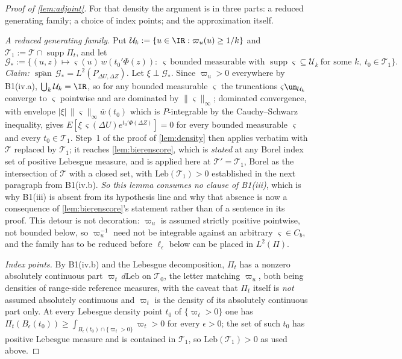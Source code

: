 \begin{proof}[Proof of \cref{lem:adjoint}]
For that density the argument is in three parts: a reduced generating family; a
choice of index points; and the approximation itself.

\emph{A reduced generating family.} Put $\mathcal U_k:=\{u\in\IR:\varpi_u(u)\ge1/k\}$ and
$\mathcal T_1:=\mathcal T\cap\operatorname{supp}\Pi_t$, and let
\[
\mathcal G_\ast:=\big\{(u,z)\mapsto\varsigma(u)\,w(t_0'\Phi(z)):\ \varsigma\ \text{bounded measurable with }
\operatorname{supp}\varsigma\subseteq\mathcal U_k\ \text{for some }k,\ t_0\in\mathcal T_1\big\}.
\]
\emph{Claim: $\overline{\operatorname{span}}\,\mathcal G_\ast=L^{2}(P_{\Delta U,\Delta Z})$.} Let
$\xi\perp\mathcal G_\ast$. Since $\varpi_u>0$ everywhere by B1(iv.a), $\bigcup_k\mathcal U_k=\IR$, so for
any bounded measurable $\varsigma$ the truncations $\varsigma\un_{\mathcal U_k}$ converge to $\varsigma$
pointwise and are dominated by $\|\varsigma\|_\infty$; dominated convergence, with envelope
$|\xi|\,\|\varsigma\|_\infty\bar w(t_0)$ which is $P$-integrable by the Cauchy--Schwarz inequality,
gives $E[\xi\,\varsigma(\Delta U)e^{t_0'\Phi(\Delta Z)}]=0$ for every bounded measurable $\varsigma$ and
every $t_0\in\mathcal T_1$. Step~1 of the proof of \cref{lem:density} then applies verbatim with
$\mathcal T$ replaced by $\mathcal T_1$; it reaches \cref{lem:bierenscore}, which is \emph{stated} at any
Borel index set of positive Lebesgue measure, and is applied here at $\mathcal T'=\mathcal T_1$, Borel as
the intersection of $\mathcal T$ with a closed set, with $\mathrm{Leb}(\mathcal T_1)>0$ established in
the next paragraph from B1(iv.b). \emph{So this lemma consumes no clause of B1(iii)}, which is why
B1(iii) is absent from its hypothesis line and why that absence is now a consequence of
\cref{lem:bierenscore}'s statement rather than of a sentence in its proof. This
detour is not decoration: $\varpi_u$ is assumed strictly positive pointwise, not bounded below, so
$\varpi_u^{-1}$ need not be integrable against an arbitrary $\varsigma\in C_b$, and the family has to be
reduced before $\ell_\epsilon$ below can be placed in $L^{2}(\Pi)$.

\emph{Index points.} By B1(iv.b) and the Lebesgue decomposition, $\Pi_t$ has a nonzero absolutely
continuous part $\varpi_t\,d\mathrm{Leb}$ on $\mathcal T_0$, the letter matching $\varpi_u$, both
being densities of range-side reference measures, with the caveat that $\Pi_t$ itself is \emph{not}
assumed absolutely continuous and $\varpi_t$ is the density of its absolutely continuous part only. At
every Lebesgue density point $t_0$ of $\{\varpi_t>0\}$ one has
$\Pi_t(B_\epsilon(t_0))\ge\int_{B_\epsilon(t_0)\cap\{\varpi_t>0\}}\varpi_t>0$ for every $\epsilon>0$; the
set of such $t_0$ has positive Lebesgue measure and is contained in $\mathcal T_1$, so
$\mathrm{Leb}(\mathcal T_1)>0$ as used above.


\end{proof}

